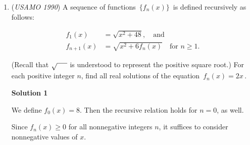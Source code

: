 \begin{enumerate}
\begin{verbatim}
 \[n=1 \quad \text{1 element} \quad n=2 \quad \text{10 elements}\]  Suppose for $n$, we have a set $\left\{ \left( a_1, \ldots, a_n \right) \right\}$ that satisfies the condition. We need to construct $S_{n+1}$ such that it does not contain $\left( a_1, \ldots, a_n \right)$, denoted as $\left( b_1, \ldots, b_n \right)$.  Construct:  
 \[S_{n+1} = \left\{ \left( a_1, a_2, \ldots, a_{n-k}, k \right) \mid k = 1, 2, \ldots, 10, \left( a_1, \ldots, a_n \right) \in S_n \right\}\]  If $\left( a_1 + k, \ldots, a_{n+k}, k \right)$ and $\left( b_1, \ldots, b_{n+\ell}, \ell \right)$ have exactly one difference:  1. Case 1: $k \neq \ell$     
 \[a_1 = b_1, \ldots, a_{n-1} = b_{n-1}, a_n = b_n \Rightarrow a_{n+k} \neq b_{n+\ell}, \text{contradiction}\]  2. Case 2: $k = \ell$     If $a_i = b_i$ for $i \neq n$,     
 \[a_1 = b_1, \ldots, a_n = b_n \quad (\text{removing } i)\]     Contradiction! If $a_{n+k} \neq b_{n+\ell} \Rightarrow a_n \neq b_n$, contradiction with the same $k$.  At least two positions are different, i.e., there cannot be exactly one difference. Therefore, in the set $\{0, 1, \ldots, 9\}^6$ (hypercube), there are no collinear points (parallel to the coordinate axes).  
 \[\text{1 dimension: 1 element}\]  
 \[\text{2 dimensions: 10 elements}\]  
 \[\text{3 dimensions: 100 elements}\]  
 \[10^6 \text{ points can be covered by } 10^5 \text{ lines} \Rightarrow \text{At most } 10^5 \text{ elements.}\]
\end{verbatim}




	\item (\textit{USAMO 1990}) A sequence of functions $\, \{f_n(x) \} \,$ is defined recursively as follows:

 \begin{align*} f_1(x) &= \sqrt {x^2 + 48}, \quad \text{and} \\ f_{n + 1}(x) &= \sqrt {x^2 + 6f_n(x)} \quad \text{for } n \geq 1. \end{align*}

(Recall that $\sqrt {\makebox[5mm]{}}$ is understood to represent the positive square root.) For each positive integer $n$, find all real solutions of the equation $\, f_n(x) = 2x \,$.


 



\textbf{Solution 1}

We define $f_0(x) = 8$.  Then the recursive relation holds for $n=0$, as well.

 Since $f_n (x) \ge 0$ for all nonnegative integers $n$, it suffices to consider nonnegative values of $x$.


\end{enumerate}

